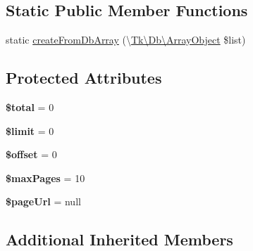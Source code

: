 \subsection*{Static Public Member Functions}
\begin{DoxyCompactItemize}
\item 
static \hyperlink{classTk_1_1Table_1_1Renderer_1_1Dom_1_1Ui_1_1Pager_a8767a5772db4f6837f81ce8c36e56666}{create\+From\+Db\+Array} (\textbackslash{}\hyperlink{classTk_1_1Db_1_1ArrayObject}{Tk\textbackslash{}\+Db\textbackslash{}\+Array\+Object} \$list)
\end{DoxyCompactItemize}
\subsection*{Protected Attributes}
\begin{DoxyCompactItemize}
\item 
\hypertarget{classTk_1_1Table_1_1Renderer_1_1Dom_1_1Ui_1_1Pager_a4494440fbe5113f598c46a1c17beaebf}{{\bfseries \$total} = 0}\label{classTk_1_1Table_1_1Renderer_1_1Dom_1_1Ui_1_1Pager_a4494440fbe5113f598c46a1c17beaebf}

\item 
\hypertarget{classTk_1_1Table_1_1Renderer_1_1Dom_1_1Ui_1_1Pager_a620cb759432a049c609d4473f102a71a}{{\bfseries \$limit} = 0}\label{classTk_1_1Table_1_1Renderer_1_1Dom_1_1Ui_1_1Pager_a620cb759432a049c609d4473f102a71a}

\item 
\hypertarget{classTk_1_1Table_1_1Renderer_1_1Dom_1_1Ui_1_1Pager_a8d520ff138f5edcccba2f2f821085c60}{{\bfseries \$offset} = 0}\label{classTk_1_1Table_1_1Renderer_1_1Dom_1_1Ui_1_1Pager_a8d520ff138f5edcccba2f2f821085c60}

\item 
\hypertarget{classTk_1_1Table_1_1Renderer_1_1Dom_1_1Ui_1_1Pager_a9ae3725e2ced4b213c4aafd41abdb985}{{\bfseries \$max\+Pages} = 10}\label{classTk_1_1Table_1_1Renderer_1_1Dom_1_1Ui_1_1Pager_a9ae3725e2ced4b213c4aafd41abdb985}

\item 
\hypertarget{classTk_1_1Table_1_1Renderer_1_1Dom_1_1Ui_1_1Pager_a086ff098efa5b01c6123c88b954615e0}{{\bfseries \$page\+Url} = null}\label{classTk_1_1Table_1_1Renderer_1_1Dom_1_1Ui_1_1Pager_a086ff098efa5b01c6123c88b954615e0}

\end{DoxyCompactItemize}
\subsection*{Additional Inherited Members}


